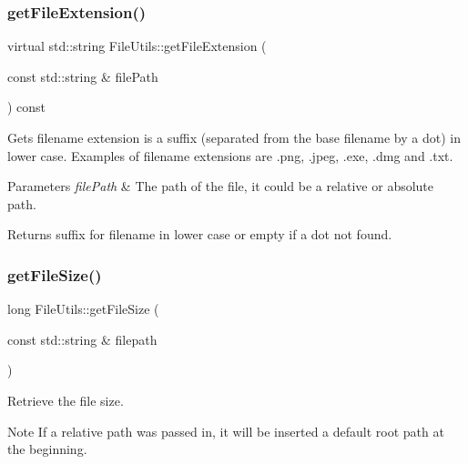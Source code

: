 \subsubsection{\texorpdfstring{get\+File\+Extension()}{getFileExtension()}\hspace{0.1cm}{\footnotesize\ttfamily [2/2]}}
{\footnotesize\ttfamily virtual std\+::string File\+Utils\+::get\+File\+Extension (\begin{DoxyParamCaption}\item[{const std\+::string \&}]{file\+Path }\end{DoxyParamCaption}) const\hspace{0.3cm}{\ttfamily [virtual]}}

Gets filename extension is a suffix (separated from the base filename by a dot) in lower case. Examples of filename extensions are .png, .jpeg, .exe, .dmg and .txt. 
\begin{DoxyParams}{Parameters}
{\em file\+Path} & The path of the file, it could be a relative or absolute path. \\
\hline
\end{DoxyParams}
\begin{DoxyReturn}{Returns}
suffix for filename in lower case or empty if a dot not found. 
\end{DoxyReturn}
\mbox{\label{classFileUtils_a1804c928fb8897e07e181a8e72362e0a}} 
\subsubsection{\texorpdfstring{get\+File\+Size()}{getFileSize()}\hspace{0.1cm}{\footnotesize\ttfamily [1/3]}}
{\footnotesize\ttfamily long File\+Utils\+::get\+File\+Size (\begin{DoxyParamCaption}\item[{const std\+::string \&}]{filepath }\end{DoxyParamCaption})\hspace{0.3cm}{\ttfamily [virtual]}}

Retrieve the file size.

\begin{DoxyNote}{Note}
If a relative path was passed in, it will be inserted a default root path at the beginning. 
\end{DoxyNote}

